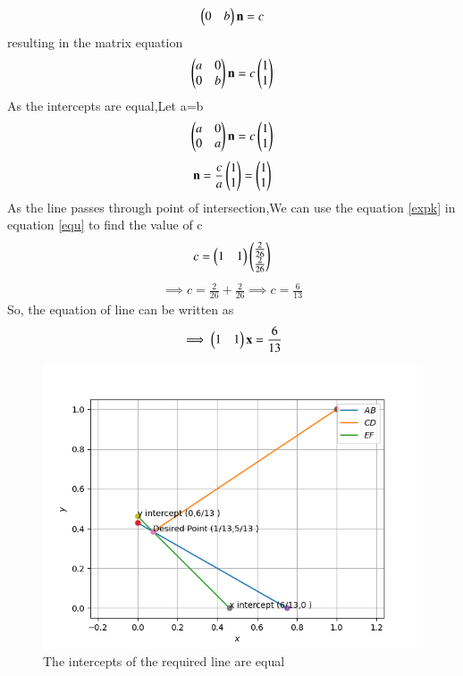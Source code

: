    \begin{align} 
    \begin{pmatrix}0 & b\end{pmatrix}\mathbf{n} = c
    \end{align}
    resulting in the matrix equation
    \begin{align}
    \begin{pmatrix}a & 0 \\ 0 & b\end{pmatrix}\mathbf{n} = c \begin{pmatrix}1 \\ 1\end{pmatrix}
    \end{align}
    As the intercepts are equal,Let a=b
    \begin{align}
    \begin{pmatrix}a & 0 \\ 0 & a\end{pmatrix}\mathbf{n} = c \begin{pmatrix}1 \\ 1\end{pmatrix}
    \end{align}
    \begin{align}
    \mathbf{n} = \frac{c}{a}\begin{pmatrix}1\\1\end{pmatrix} = \begin{pmatrix}1\\1\end{pmatrix}
    \end{align}
    As the line passes through point of intersection,We can use the equation \eqref{expk} in equation \eqref{equ} to find the value of c\\
    \begin{align}
    c=
    \begin{pmatrix}1 & 1\end{pmatrix}
    \begin{pmatrix}\frac{2}{26} \\  
    	\frac{2}{26} \end{pmatrix}
    \end{align}
    \begin{align}
    \implies c=\frac{2}{26}+\frac{2}{26}
    \implies c=\frac{6}{13}
    \end{align}
    So, the equation of line can be written as
    \begin{align}
    \implies
    \begin{pmatrix}1 & 1\end{pmatrix}
    	{\mathbf{x}} = \frac{6}{13}
    \end{align}
    \begin{figure}[!ht]
    \centering
    \includegraphics[width=\columnwidth]{./solutions/line_plane/50/Assignment_1}
     \caption{The intercepts of the required line are equal}
\label{fig:solutions/line_plane/50/}
    \end{figure}
